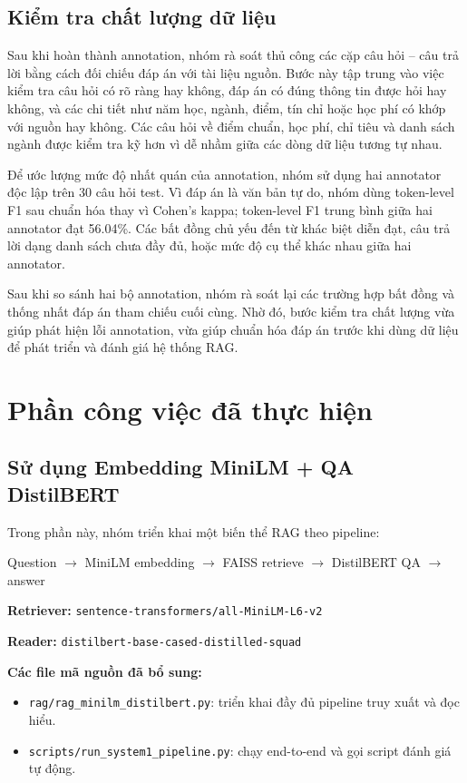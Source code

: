 \documentclass[12pt,a4paper]{report}
\begin{document}
\section{Kiểm tra chất lượng dữ liệu}

Sau khi hoàn thành annotation, nhóm rà soát thủ công các cặp câu hỏi -- câu trả lời bằng cách đối chiếu đáp án với tài liệu nguồn. Bước này tập trung vào việc kiểm tra câu hỏi có rõ ràng hay không, đáp án có đúng thông tin được hỏi hay không, và các chi tiết như năm học, ngành, điểm, tín chỉ hoặc học phí có khớp với nguồn hay không. Các câu hỏi về điểm chuẩn, học phí, chỉ tiêu và danh sách ngành được kiểm tra kỹ hơn vì dễ nhầm giữa các dòng dữ liệu tương tự nhau.

Để ước lượng mức độ nhất quán của annotation, nhóm sử dụng hai annotator độc lập trên 30 câu hỏi test. Vì đáp án là văn bản tự do, nhóm dùng token-level F1 sau chuẩn hóa thay vì Cohen's kappa; token-level F1 trung bình giữa hai annotator đạt 56.04\%. Các bất đồng chủ yếu đến từ khác biệt diễn đạt, câu trả lời dạng danh sách chưa đầy đủ, hoặc mức độ cụ thể khác nhau giữa hai annotator.

Sau khi so sánh hai bộ annotation, nhóm rà soát lại các trường hợp bất đồng và thống nhất đáp án tham chiếu cuối cùng. Nhờ đó, bước kiểm tra chất lượng vừa giúp phát hiện lỗi annotation, vừa giúp chuẩn hóa đáp án trước khi dùng dữ liệu để phát triển và đánh giá hệ thống RAG.


\chapter{Phần công việc đã thực hiện}

\section{Sử dụng Embedding MiniLM + QA DistilBERT}

Trong phần này, nhóm triển khai một biến thể RAG theo pipeline:

\begin{center}
Question $\rightarrow$ MiniLM embedding $\rightarrow$ FAISS retrieve $\rightarrow$ DistilBERT QA $\rightarrow$ answer
\end{center}

\textbf{Retriever:} \texttt{sentence-transformers/all-MiniLM-L6-v2}

\textbf{Reader:} \texttt{distilbert-base-cased-distilled-squad}

\textbf{Các file mã nguồn đã bổ sung:}
\begin{itemize}
    \item \texttt{rag/rag\_minilm\_distilbert.py}: triển khai đầy đủ pipeline truy xuất và đọc hiểu.
    \item \texttt{scripts/run\_system1\_pipeline.py}: chạy end-to-end và gọi script đánh giá tự động.
\end{itemize}
\end{document}
